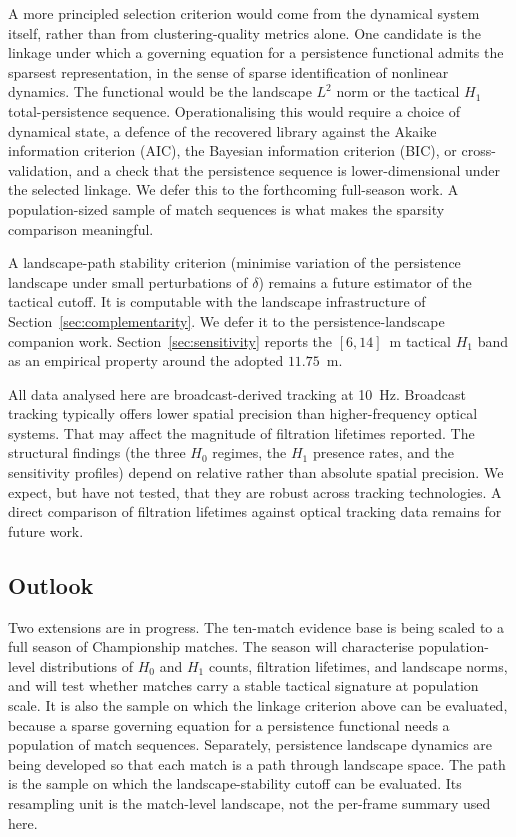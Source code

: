 A more principled selection criterion would come from the dynamical
system itself, rather than from clustering-quality metrics alone. One
candidate is the linkage under which a governing equation for a
persistence functional admits the sparsest representation, in the
sense of sparse identification of nonlinear dynamics. The functional
would be the landscape $L^2$ norm or the tactical $H_1$
total-persistence sequence. Operationalising this would require a
choice of dynamical state, a defence of the recovered library against
the Akaike information criterion (AIC), the Bayesian information
criterion (BIC), or cross-validation, and a check that the persistence
sequence is lower-dimensional under the selected linkage. We defer this
to the forthcoming full-season work. A population-sized sample of
match sequences is what makes the sparsity comparison meaningful.

A landscape-path stability criterion (minimise variation of the
persistence landscape under small perturbations of $\delta$) remains a
future estimator of the tactical cutoff. It is computable with the
landscape infrastructure of Section~\ref{sec:complementarity}. We
defer it to the persistence-landscape companion work.
Section~\ref{sec:sensitivity} reports the $[6,14]$~m tactical
$H_1$ band as an empirical property around the adopted $11.75$~m.

All data analysed here are broadcast-derived tracking at 10~Hz.
Broadcast tracking typically offers lower spatial precision than
higher-frequency optical systems. That may affect the magnitude of
filtration lifetimes reported. The structural findings (the three
$H_0$ regimes, the $H_1$ presence rates, and the sensitivity profiles)
depend on relative rather than absolute spatial precision. We expect,
but have not tested, that they are robust across tracking technologies.
A direct comparison of filtration lifetimes against optical tracking
data remains for future work.

\subsection{Outlook}

Two extensions are in progress. The ten-match evidence base is being scaled
to a full season of Championship matches. The season will characterise
population-level distributions of $H_0$ and $H_1$ counts, filtration
lifetimes, and landscape norms, and will test whether matches carry a
stable tactical signature at population scale. It is also the sample
on which the linkage criterion above can be evaluated, because a sparse
governing equation for a persistence functional needs a population of
match sequences. Separately, persistence landscape dynamics are being
developed so that each match is a path through landscape space. The
path is the sample on which the landscape-stability cutoff can be
evaluated. Its resampling unit is the match-level landscape, not the
per-frame summary used here.
